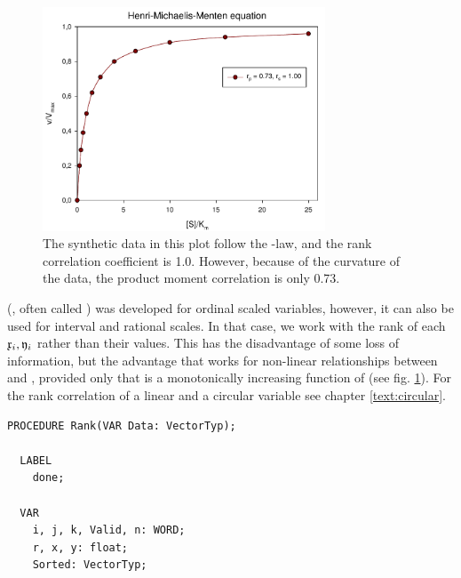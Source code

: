 \begin{refsection}
\begin{figure}
   \caption{The synthetic data in this plot follow the -law, and the rank correlation coefficient  is \num{1.0}. However, because of the curvature of the data, the product moment correlation  is only \num{0.73}.}
   \label{fig:Corr}
   \centering
      \includegraphics[width=0.75\textwidth]{Graphics/Correlation}
\end{figure}

 (\parencite{Spe-04}, often called \textrho) was developed for ordinal scaled variables, however, it can also be used for interval and rational scales. In that case, we work with the rank of each \( \mathfrak{x}_i, \mathfrak{y}_i \) rather than their values. This has the disadvantage of some loss of information, but the advantage that  works for non-linear relationships between  and , provided only that  is a monotonically increasing function of  (see fig. \ref{fig:Corr}). For the rank correlation of a linear and a circular variable see chapter \ref{text:circular}.


\begin{lstlisting}[caption=Ranking of a variable]
  PROCEDURE Rank(VAR Data: VectorTyp);

  LABEL
    done;

  VAR
    i, j, k, Valid, n: WORD;
    r, x, y: float;
    Sorted: VectorTyp;


\end{lstlisting}
\end{refsection}
